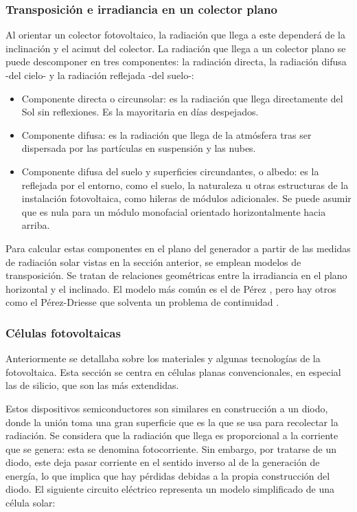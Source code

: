 \subsubsection{Transposición e irradiancia en un colector plano}

Al orientar un colector fotovoltaico, la radiación que llega a este dependerá de la inclinación y el \gls{acimut} del colector. La radiación que llega a un colector plano se puede descomponer en tres componentes: la radiación \gls{directa}, la radiación \gls{difusa} -del cielo- y la radiación \gls{reflejada} -del suelo-:

\begin{itemize}
      \item Componente \gls{directa} o circunsolar: es la radiación que llega directamente del Sol sin reflexiones. Es la mayoritaria en días despejados.
      \item Componente difusa: es la radiación que llega de la atmósfera tras ser dispersada por las partículas en suspensión y las nubes.
      \item Componente difusa del suelo y superficies circundantes, o albedo: es la reflejada por el entorno, como el suelo, la naturaleza u otras estructuras de la instalación fotovoltaica, como hileras de módulos adicionales. Se puede asumir que es nula para un \gls{módulo} \gls{monofacial} orientado horizontalmente hacia arriba.
\end{itemize}

Para calcular estas componentes en el plano del generador a partir de las medidas de radiación solar vistas en la sección anterior, se emplean modelos de \gls{transposición}. Se tratan de relaciones geométricas entre la \gls{irradiancia} en el plano horizontal y el inclinado. El \gls{modelo} más común es el de Pérez \cite{Perez_Ineichen_Seals_Michalsky_Stewart_1990}, pero hay otros como el Pérez-Driesse que solventa un problema de continuidad \cite{Driesse_Jensen_Perez_2024}.

\subsubsection{Células fotovoltaicas}

Anteriormente se detallaba sobre los materiales y algunas tecnologías de la fotovoltaica. Esta sección se centra en células planas convencionales, en especial las de silicio, que son las más extendidas.

Estos dispositivos semiconductores son similares en construcción a un \gls{diodo}, donde la unión toma una gran superficie que es la que se usa para recolectar la radiación. Se considera que la radiación que llega es proporcional a la corriente que se genera: esta se denomina fotocorriente. Sin embargo, por tratarse de un \gls{diodo}, este deja pasar corriente en el sentido inverso al de la generación de energía, lo que implica que hay pérdidas debidas a la propia construcción del \gls{diodo}. El siguiente circuito eléctrico representa un \gls{modelo} simplificado de una célula solar:

